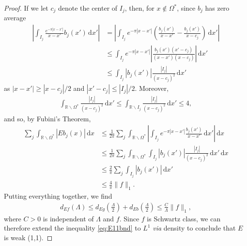 \documentclass[../dissertation.tex]{subfiles}
\begin{document}
\begin{proof}
    If we let $c_j$ denote the center of $I_j$, then, for $x \notin \Omega^*$, 
    since $b_j$ has zero average
    \begin{align*}
        \left|\int_{I_j} \frac{e^{-\pi|x - x'|}}{x - x'} b_j(x') \, \mathrm{d}x'\right|
            &= \left|\int_{I_j} e^{-\pi|x - x'|}
                \left(\frac{b_j(x')}{x - x'} - \frac{b_j(x')}{x - c_j}  \right)\, \mathrm{d}x'\right| \\
            &\leq \int_{I_j} e^{-\pi|x - x'|}
                \left|\frac{b_j(x')(x' - c_j)}{(x - x')(x-c_j)}\right| \, \mathrm{d}x' \\
            &\leq \int_{I_j} |b_j(x')| \frac{|I_j|}{(x - c_j)^2} \, \mathrm{d}x'
    \end{align*}
    as $|x - x'| \geq |x - c_j|/2$ and $|x' - c_j| \leq |I_j|/2$. Moreover, 
    \begin{align} \label{eq:IjIntBnd}
        \int_{\mathbb R \backslash \Omega^*} \frac{|I_j|}{(x - c_j)^2} \, \mathrm{d}x'
            \leq \int_{\mathbb R \backslash I_j} \frac{|I_j|}{(x - c_j)^2} \, \mathrm{d}x'
            \leq 4,
    \end{align}
    and so, by Fubini's Theorem,
    \begin{align} \label{eq:sumEbj}
        \sum_j \int_{\mathbb R \backslash \Omega^*} \left| E b_j(x) \right| \, \mathrm{d}x
            &\leq \frac{1}{2\pi} \sum_j\int_{\mathbb R \backslash \Omega^*} 
                \left| \int_{I_j} e^{-\pi|x-x'|} \frac{b_j(x')}{x - x'} \, \mathrm{d}x' \right| \, \mathrm{d}x 
                \\
            &\leq \frac{1}{2\pi} \sum_j \int_{\mathbb R \backslash \Omega^*}  \int_{I_j}
                |b_j(x')| \frac{|I_j|}{(x - c_j)^2} \, \mathrm{d}x' \, \mathrm{d}x 
                \nonumber \\
            &\leq \frac{2}{\pi} \sum_j \int_{I_j} |b_j(x')| \, \mathrm{d}x' 
                \nonumber \\
            &\leq \frac{4}{\pi} \| f\|_1. \nonumber
    \end{align}
    Putting everything together, we find
    \begin{align} \label{eq:E11bnd}
        d_{Ef}(\Lambda) 
            \leq d_{Eg}\left(\frac{\Lambda}{2}\right) + d_{Eb}\left(\frac{\Lambda}{2}\right)
            \leq \frac{C}{\Lambda} \| f\|_1,
    \end{align}
    where $C>0$ is independent of $\Lambda$ and $f$. Since $f$ is Schwartz class, we can 
    therefore extend the inequality \eqref{eq:E11bnd} to $L^1$ \textit{via} density to
    conclude that $E$ is weak (1,1).
\end{proof}
\end{document}
